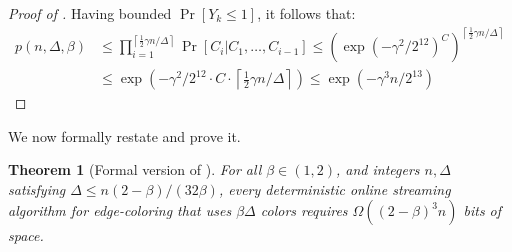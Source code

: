 \documentclass[10pt]{article}
\newtheorem{theorem}{Theorem}[section]
\theoremstyle{definition}\newtheorem{definition}[lemma]{Definition}
\theoremstyle{remark}  \newtheorem*{remark}{Remark}
\newcommand{\ceil}[1]{{\left\lceil{#1}\right\rceil}}
\begin{document}
\begin{proof}[Proof of ]
  Having bounded $\Pr[Y_k \le 1]$, it follows that:
  \begin{align*}
    p(n, \Delta, \beta) &\le \prod_{i = 1}^{\ceil{\frac{1}{2} \gamma n / \Delta}} \Pr[C_i | C_1,\ldots,C_{i-1}] \le \left( \exp\left(- \gamma^2 / 2^{12}\right)^C \right)^{\ceil{\frac{1}{2} \gamma n / \Delta}} \\
      &\le  \exp\left(- \gamma^2 / 2^{12} \cdot C \cdot \ceil{\frac{1}{2} \gamma n / \Delta} \right) \le \exp(-\gamma^3 n / 2^{13})
  \end{align*}
\end{proof}

We now formally restate  and prove it.
\begin{theorem}[Formal version of ]\label{thm:det-online-va-lb-formal}
  For all $\beta \in (1,2)$, and integers $n,\Delta$ satisfying $\Delta \le n  (2-\beta) / (32 \beta)$, every deterministic online streaming algorithm for edge-coloring that uses $\beta \Delta$ colors requires $\Omega((2-\beta)^3 n)$ bits of space.
\end{theorem}
\end{document}
